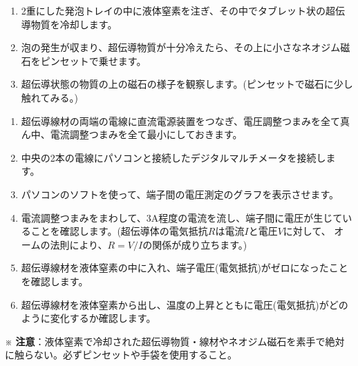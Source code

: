 \bigskip



\begin{enumerate}

\item 2重にした発泡トレイの中に液体窒素を注ぎ、その中でタブレット状の超伝導物質を冷却します。
\item 泡の発生が収まり、超伝導物質が十分冷えたら、その上に小さなネオジム磁石をピンセットで乗せます。
\item 超伝導状態の物質の上の磁石の様子を観察します。(ピンセットで磁石に少し触れてみる。)

\end{enumerate}


\bigskip


\begin{enumerate}

\item  超伝導線材の両端の電線に直流電源装置をつなぎ、電圧調整つまみを全て真ん中、電流調整つまみを全て最小にしておきます。
\item 中央の2本の電線にパソコンと接続したデジタルマルチメータを接続します。
\item パソコンのソフトを使って、端子間の電圧測定のグラフを表示させます。
\item 電流調整つまみをまわして、3A程度の電流を流し、端子間に電圧が生じていることを確認します。(超伝導体の電気抵抗$R$は電流$I$と電圧$V$に対して、
オームの法則により、$R=V/I$の関係が成り立ちます。)
\item 超伝導線材を液体窒素の中に入れ、端子電圧(電気抵抗)がゼロになったことを確認します。
\item 超伝導線材を液体窒素から出し、温度の上昇とともに電圧(電気抵抗)がどのように変化するか確認します。

\end{enumerate}

\bigskip
\hspace*{-\parindent}
※ {\bf 注意}：液体窒素で冷却された超伝導物質・線材やネオジム磁石を素手で絶対に触らない。必ずピンセットや手袋を使用すること。

